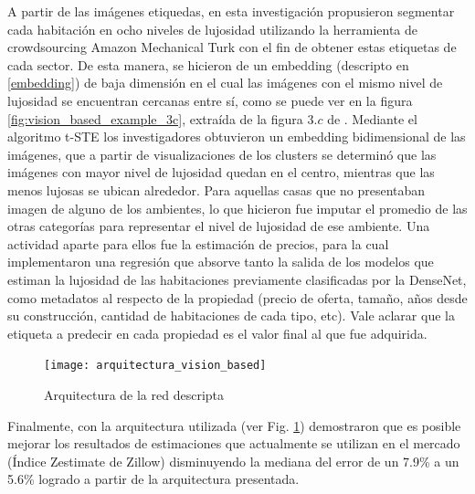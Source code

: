 A partir de las imágenes etiquedas, en esta investigación propusieron segmentar cada habitación en ocho niveles de lujosidad utilizando la herramienta de crowdsourcing Amazon Mechanical Turk con el fin de obtener estas etiquetas de cada sector. De esta manera, se hicieron de un embedding (descripto en \ref{embedding}) de baja dimensión en el cual las imágenes con el mismo nivel de lujosidad se encuentran cercanas entre sí, como se puede ver en la figura \ref{fig:vision_based_example_3c}, extraída de la figura \(3.c\) de \cite{vision_based_real_estate_price_estimation}. Mediante el algoritmo t-STE los investigadores obtuvieron un embedding bidimensional de las imágenes, que a partir de visualizaciones de los clusters se determinó que las imágenes con mayor nivel de lujosidad quedan en el centro, mientras que las menos lujosas se ubican alrededor. Para aquellas casas que no presentaban imagen de alguno de los ambientes, lo que hicieron fue imputar el promedio de las otras categorías para representar el nivel de lujosidad de ese ambiente.
Una actividad aparte para ellos fue la estimación de precios, para la cual implementaron una regresión que absorve tanto la salida de los modelos que estiman la lujosidad de las habitaciones previamente clasificadas por la DenseNet, como metadatos al respecto de la propiedad (precio de oferta, tamaño, años desde su construcción, cantidad de habitaciones de cada tipo, etc). Vale aclarar que la etiqueta a predecir en cada propiedad es el valor final al que fue adquirida.
\begin{figure}[h!]
	\centering
	\texttt{[image: arquitectura\_vision\_based]}
	\caption[Vision Based Architecture]{Arquitectura de la red descripta}
	\label{fig:arquitecturavisionbased}
\end{figure}

Finalmente, con la arquitectura utilizada (ver Fig. 	\ref{fig:arquitecturavisionbased}) demostraron que es posible mejorar los resultados de estimaciones que actualmente se utilizan en el mercado (Índice Zestimate de Zillow) disminuyendo la mediana del error de un 7.9\% a un 5.6\% logrado a partir de la arquitectura presentada.

